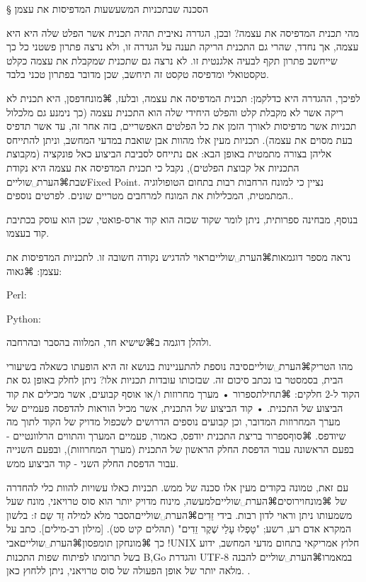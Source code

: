 § הסכנה שבתכניות המשעשעות המדפיסות את עצמן

מהי תכנית המדפיסה את עצמה? ובכן, הגדרה נאיבית תהיה תכנית אשר הפלט שלה היא היא עצמה, אך נחדד, שהרי גם התכנית הריקה תענה על הגדרה זו, ולא נרצה פתרון פשטני כל כך שייחשב פתרון תקף לבעיה אלגנטית זו. לא נרצה גם שתכנית שמקבלת את עצמה כקלט טקסטואלי ומדפיסה טקסט זה תיחשב, שכן מדובר בפתרון טכני בלבד. 

לפיכך, ההגדרה היא כדלקמן: תכנית המדפיסה את עצמה, ובלעז, ⌘מונח{דפסן}, היא תכנית לא ריקה אשר לא מקבלת קלט והפלט היחידי שלה הוא התכנית עצמה (כך נימנע גם מלכלול תכניות אשר מדפיסות לאורך הזמן את כל הפלטים האפשריים, בזה אחר זה, עד אשר תדפיס בעת מסוים את עצמה). תכניות מעין אלו מהוות אבן שואבת במדעי המחשב, וניתן להתייחס אליהן בצורה מתמטית באופן הבא: אם נתייחס לסביבת הביצוע כאל פונקציה (מקבוצת התכניות אל קבוצת הפלטים), נקבל כי תכנית המדפיסה את עצמה היא נקודת שבת⌘הערת␣שוליים{Fixed Point. נציין כי למונח הרחבות רבות בתחום הטופולוגיה המתמטית, המכלילות את המונח למרחבים מטריים שונים. לפרטים נוספים.}. 

בנוסף, מבחינה ספרותית, ניתן לומר שקוד שכזה הוא קוד ארס-פואטי, שכן הוא עוסק בכתיבת קוד בעצמו. 

נראה מספר דוגמאות⌘הערת␣שוליים{ראוי להדגיש נקודה חשובה זו.} לתכניות המדפיסות את עצמן:
⌘גאוה:


Perl:



Python:

ולהלן דוגמה ב⌘שי{שיא חד}, המלווה בהסבר ובהרחבה.



מהו הטריק⌘הערת␣שוליים{סיבה נוספת להתעניינות בנושא זה היא הופעתו כשאלה בשיעורי הבית, בסמסטר בו נכתב סיכום זה.} שבזכותו עובדות תכניות אלו? ניתן לחלק באופן גס את הקוד ל-2 חלקים: 
⌘תחילת{ספרור}
• מערך מחרוזות ו/או אוסף קבועים, אשר מכילים את קוד הביצוע של התכנית.
• קוד הביצוע של התכנית, אשר מכיל הוראות להדפסה פעמיים של מערך המחרוזות המדובר, וכן קבועים נוספים הדרושים לשכפול מדויק של הקוד לתוך מה שיודפס. 
⌘סוף{ספרור}
בריצת התכנית יודפס, כאמור, פעמיים המערך והתווים הרלוונטיים - בפעם הראשונה עבור הדפסת החלק הראשון של התכנית (מערך המחרוזות), ובפעם השנייה עבור הדפסת החלק השני - קוד הביצוע ממש. 

עם זאת, טמונה בקודים מעין אלו סכנה של ממש. תכניות כאלו עשויות להוות כלי להחדרה של ⌘מונח{וירוסים}⌘הערת␣שוליים{למעשה, מינוח מדויק יותר הוא סוס טרויאני, מונח שעל משמעותו ניתן וראוי לדון רבות.} בידי זֵדִים⌘הערת␣שוליים{הסבר מלא למילה זֵד שֵם ז: בלשון המקרא אדם רע, רשע; "טָפְלוּ עָלַי שֶׁקֶר זֵדִים" (תהלים קיט סט). [מילון רב-מילים]}. כתב על כך ⌘מונח{קן תומפסון}⌘הערת␣שוליים{אבי !UNIX חלוץ אמריקאי בתחום מדעי המחשב, ידוע בשל תרומתו לפיתוח שפות התכנות B,Go והגדרת UTF-8} במאמרו⌘הערת␣שוליים {להבנה מלאה יותר של אופן הפעולה של סוס טרויאני, ניתן ללחוץ כאן.
 }.

